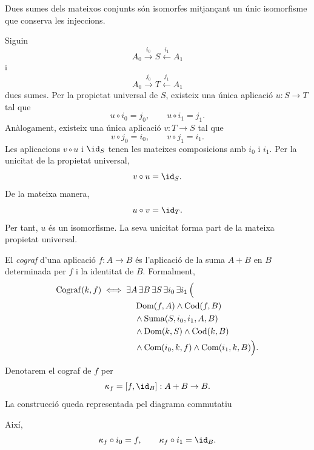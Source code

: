 \begin{proposicio}\label{prop:suma-unica}
Dues sumes dels mateixos conjunts són isomorfes mitjançant un únic isomorfisme que conserva les injeccions.
\end{proposicio}

\begin{prova}
Siguin
\[
A_0\xrightarrow{i_0}S\xleftarrow{i_1}A_1
\]
i
\[
A_0\xrightarrow{j_0}T\xleftarrow{j_1}A_1
\]
dues sumes. Per la propietat universal de \(S\), existeix una única aplicació \(u:S\to T\) tal que
\[
u\circ i_0=j_0,
\qquad
u\circ i_1=j_1.
\]
Anàlogament, existeix una única aplicació \(v:T\to S\) tal que
\[
v\circ j_0=i_0,
\qquad
v\circ j_1=i_1.
\]
Les aplicacions \(v\circ u\) i \(\id_S\) tenen les mateixes composicions amb \(i_0\) i \(i_1\). Per la unicitat de la propietat universal,
\[
v\circ u=\id_S.
\]
De la mateixa manera,
\[
u\circ v=\id_T.
\]
Per tant, \(u\) és un isomorfisme. La seva unicitat forma part de la mateixa propietat universal.
\end{prova}

\begin{definicio}[Cograf]\label{def:cograf}
El \emph{cograf} d'una aplicació \(f:A\to B\) és l'aplicació de la suma \(A+B\) en \(B\) determinada per \(f\) i la identitat de \(B\). Formalment,
\[
\begin{aligned}
\operatorname{Cograf}(k,f)
\iff {}&
\exists A\,\exists B\,\exists S\,\exists i_0\,\exists i_1\,\Bigl(
\\
&\quad\operatorname{Dom}(f,A)\land\operatorname{Cod}(f,B)
\\
&\quad{}\land\operatorname{Suma}(S,i_0,i_1,A,B)
\\
&\quad{}\land\operatorname{Dom}(k,S)\land\operatorname{Cod}(k,B)
\\
&\quad{}\land\operatorname{Com}(i_0,k,f)\land\operatorname{Com}(i_1,k,B)
\Bigr).
\end{aligned}
\]
\end{definicio}

\begin{notacio}[Cograf]\label{not:cograf}
Denotarem el cograf de \(f\) per
\[
\kappa_f=[f,\id_B]:A+B\to B.
\]
La construcció queda representada pel diagrama commutatiu
\begin{center}
\end{center}
Així,
\[
\kappa_f\circ i_0=f,
\qquad
\kappa_f\circ i_1=\id_B.
\]
\end{notacio}

